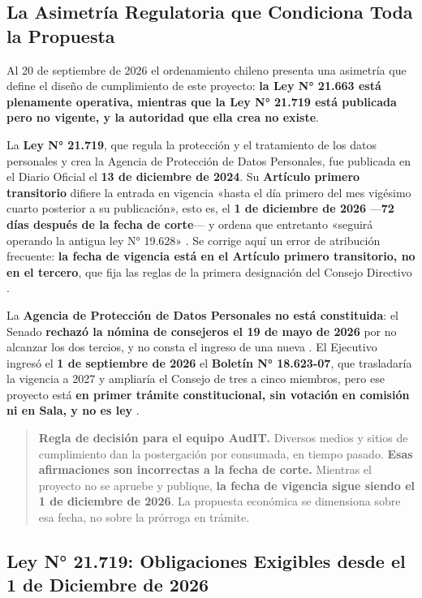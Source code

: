 \subsection{La Asimetría Regulatoria que Condiciona Toda la Propuesta}\label{la-asimetruxeda-regulatoria-que-condiciona-toda-la-propuesta}

Al 20 de septiembre de 2026 el ordenamiento chileno presenta una asimetría que define el diseño de cumplimiento de este proyecto: \textbf{la Ley N° 21.663 está plenamente operativa, mientras que la Ley N° 21.719 está publicada pero no vigente, y la autoridad que ella crea no existe}.

La \textbf{Ley N° 21.719}, que regula la protección y el tratamiento de los datos personales y crea la Agencia de Protección de Datos Personales, fue publicada en el Diario Oficial el \textbf{13 de diciembre de 2024}. Su \textbf{Artículo primero transitorio} difiere la entrada en vigencia «hasta el día primero del mes vigésimo cuarto posterior a su publicación», esto es, el \textbf{1 de diciembre de 2026} ---\textbf{72 días después de la fecha de corte}--- y ordena que entretanto «seguirá operando la antigua ley N° 19.628» . Se corrige aquí un error de atribución frecuente: \textbf{la fecha de vigencia está en el Artículo primero transitorio, no en el tercero}, que fija las reglas de la primera designación del Consejo Directivo .

La \textbf{Agencia de Protección de Datos Personales no está constituida}: el Senado \textbf{rechazó la nómina de consejeros el 19 de mayo de 2026} por no alcanzar los dos tercios, y no consta el ingreso de una nueva . El Ejecutivo ingresó el \textbf{1 de septiembre de 2026} el \textbf{Boletín N° 18.623-07}, que trasladaría la vigencia a 2027 y ampliaría el Consejo de tres a cinco miembros, pero ese proyecto está \textbf{en primer trámite constitucional, sin votación en comisión ni en Sala, y no es ley} .

\begin{quote}
\textbf{Regla de decisión para el equipo AudIT.} Diversos medios y sitios de cumplimiento dan la postergación por consumada, en tiempo pasado. \textbf{Esas afirmaciones son incorrectas a la fecha de corte.} Mientras el proyecto no se apruebe y publique, \textbf{la fecha de vigencia sigue siendo el 1 de diciembre de 2026}. La propuesta económica se dimensiona sobre esa fecha, no sobre la prórroga en trámite.
\end{quote}

\subsection{Ley N° 21.719: Obligaciones Exigibles desde el 1 de Diciembre de 2026}\label{ley-n-21.719-obligaciones-exigibles-desde-el-1-de-diciembre-de-2026}

